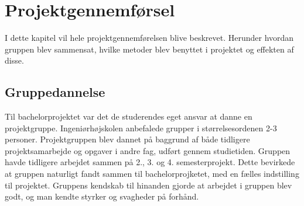 \chapter{Projektgennemførsel}
I dette kapitel vil hele projektgennemførelsen blive beskrevet. Herunder hvordan
gruppen blev sammensat, hvilke metoder blev benyttet i projektet og effekten af disse.

\section{Gruppedannelse}
Til bachelorprojektet var det de studerendes eget ansvar at danne en projektgruppe. 
Ingeniørhøjskolen anbefalede grupper i størrelsesordenen 2-3 personer. Projektgruppen
blev dannet på baggrund af både tidligere projektsamarbejde og opgaver i andre fag, udført gennem studietiden. 
Gruppen havde tidligere arbejdet sammen på 2., 3. og 4. semesterprojekt.
Dette bevirkede at gruppen naturligt fandt sammen til bachelorprojketet, med en fælles indstilling til projektet.
Gruppens kendskab til hinanden gjorde at arbejdet i gruppen blev godt, og man kendte styrker og svagheder på forhånd. \\